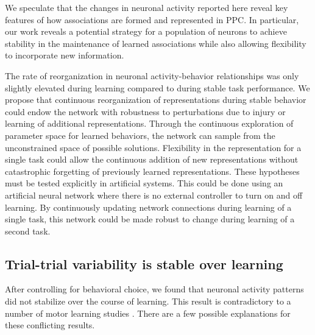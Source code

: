 We speculate that the changes in neuronal activity reported here reveal key features of how associations are formed and represented in PPC. In particular, our work reveals a potential strategy for a population of neurons to achieve stability in the maintenance of learned associations while also allowing flexibility to incorporate new information.

\bigskip

The rate of reorganization in neuronal activity-behavior relationships was only slightly elevated during learning compared to during stable task performance. We propose that continuous reorganization of representations during stable behavior could endow the network with robustness to perturbations due to injury or learning of additional representations. Through the continuous exploration of parameter space for learned behaviors, the network can sample from the unconstrained space of possible solutions. Flexibility in the representation for a single task could allow the continuous addition of new representations without catastrophic forgetting of previously learned representations. These hypotheses must be tested explicitly in artificial systems. This could be done using an artificial neural network where there is no external controller to turn on and off learning. By continuously updating network connections during learning of a single task, this network could be made robust to change during learning of a second task.

\subsection{Trial-trial variability is stable over learning}
After controlling for behavioral choice, we found that neuronal activity patterns did not stabilize over the course of learning. This result is contradictory to a number of motor learning studies \citep{Peters2014, Ganguly2009}. There are a few possible explanations for these conflicting results. 

\bigskip

